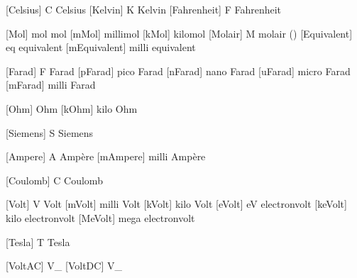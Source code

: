 
 [Celsius]    {C} {Celsius}
 [Kelvin]     {K} {Kelvin}
 [Fahrenheit] {F} {Fahrenheit} 


 [Mol]         {mol}                {mol}
 [mMol]        {\Milli \Mol}        {millimol}
 [kMol]        {\Kilo  \Mol}        {kilomol}
 [Molair]      {M}                  {molair (\Mol \Per \Liter)}
 [Equivalent]  {eq}                 {equivalent}
 [mEquivalent] {\Milli \Equivalent} {milli equivalent}


 [Farad]   {F}             {Farad}
 [pFarad]  {\Pico  \Farad} {pico Farad}
 [nFarad]  {\Nano  \Farad} {nano Farad}
 [uFarad]  {\Micro \Farad} {micro Farad}
 [mFarad]  {\Milli \Farad} {milli Farad}

 [Ohm]     {\Omega}        {Ohm}
 [kOhm]    {\Kilo \Ohm}    {kilo Ohm}

 [Siemens] {S}              {Siemens}

 [Ampere]  {A}              {Amp\`ere}
 [mAmpere] {\Milli \Ampere} {milli Amp\`ere}

 [Coulomb] {C}              {Coulomb}

 [Volt]    {V}              {Volt}
 [mVolt]   {\Milli \Volt}   {milli Volt}
 [kVolt]   {\Kilo  \Volt}   {kilo Volt}
 [eVolt]   {eV}             {electronvolt}
 [keVolt]  {\Kilo \eVolt}   {kilo electronvolt}
 [MeVolt]  {\Mega \eVolt}   {mega electronvolt}

 [Tesla]   {T}              {Tesla}

 [VoltAC]  {V_{}}  {}
 [VoltDC]  {V_{}}  {}

\setuplabeltext
  [\s!nl]
  [u:vac=wisselspanning,
   u:vdc=gelijkspanning]


